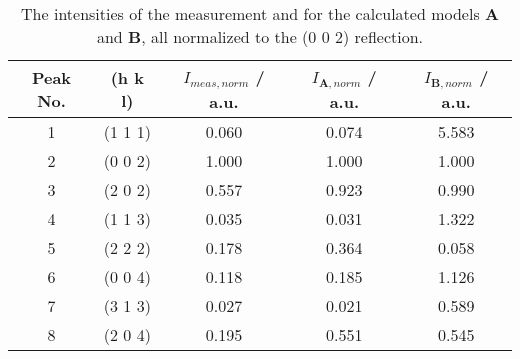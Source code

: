 \begin{table}
    \centering
    \begin{tabular}{c|c c c c}
        \hline
         Peak No. &   (h k l) &  $I_{meas,norm}$ / a.u. &  $I_{\mathbf{A},norm}$ / a.u. &   $I_{\mathbf{B},norm}$ / a.u. \\
        \hline
               1 & (1 1 1) &        0.060 &     0.074 &     5.583 \\
               2 & (0 0 2) &        1.000 &     1.000 &     1.000 \\
               3 & (2 0 2) &        0.557 &     0.923 &     0.990 \\
               4 & (1 1 3) &        0.035 &     0.031 &     1.322 \\
               5 & (2 2 2) &        0.178 &     0.364 &     0.058 \\
               6 & (0 0 4) &        0.118 &     0.185 &     1.126 \\
               7 & (3 1 3) &        0.027 &     0.021 &     0.589 \\
               8 & (2 0 4) &        0.195 &     0.551 &     0.545 \\
        \hline
        \end{tabular}
        \caption{The intensities of the measurement and for the calculated models \textbf{A} and \textbf{B}, all normalized to the (0 0 2) reflection.}
        \label{tab:ints}
\end{table}

